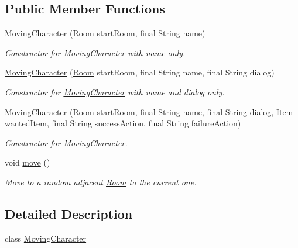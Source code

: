 \subsection*{Public Member Functions}
\begin{DoxyCompactItemize}
\item 
\hyperlink{classpkg__world_1_1pkg__characters_1_1MovingCharacter_aa8e7cc0d5fc072ea1bb2545cda28d7ee}{Moving\-Character} (\hyperlink{classpkg__world_1_1Room}{Room} start\-Room, final String name)
\begin{DoxyCompactList}\small\item\em Constructor for \hyperlink{classpkg__world_1_1pkg__characters_1_1MovingCharacter}{Moving\-Character} with name only. \end{DoxyCompactList}\item 
\hyperlink{classpkg__world_1_1pkg__characters_1_1MovingCharacter_a3ff1fb87a50e7370aea5e9da6ef8abe4}{Moving\-Character} (\hyperlink{classpkg__world_1_1Room}{Room} start\-Room, final String name, final String dialog)
\begin{DoxyCompactList}\small\item\em Constructor for \hyperlink{classpkg__world_1_1pkg__characters_1_1MovingCharacter}{Moving\-Character} with name and dialog only. \end{DoxyCompactList}\item 
\hyperlink{classpkg__world_1_1pkg__characters_1_1MovingCharacter_aa1857c9134647d712611944bfd9d793a}{Moving\-Character} (\hyperlink{classpkg__world_1_1Room}{Room} start\-Room, final String name, final String dialog, \hyperlink{classpkg__world_1_1pkg__items_1_1Item}{Item} wanted\-Item, final String success\-Action, final String failure\-Action)
\begin{DoxyCompactList}\small\item\em Constructor for \hyperlink{classpkg__world_1_1pkg__characters_1_1MovingCharacter}{Moving\-Character}. \end{DoxyCompactList}\item 
void \hyperlink{classpkg__world_1_1pkg__characters_1_1MovingCharacter_aaf4df04191a12b44ecf4d5e127c3a969}{move} ()
\begin{DoxyCompactList}\small\item\em Move to a random adjacent \hyperlink{classpkg__world_1_1Room}{Room} to the current one. \end{DoxyCompactList}\end{DoxyCompactItemize}


\subsection{Detailed Description}
class \hyperlink{classpkg__world_1_1pkg__characters_1_1MovingCharacter}{Moving\-Character} 

